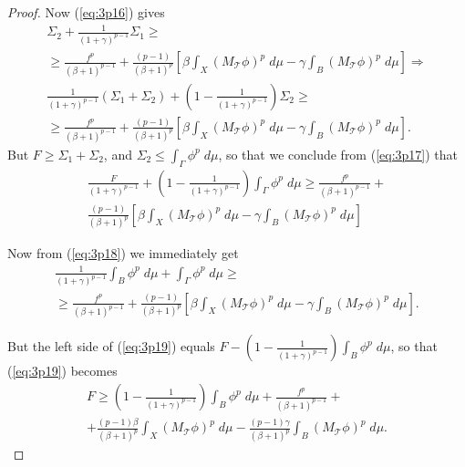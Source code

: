 \documentclass[10pt,a4paper]{amsart}
\newcommand{\mc}[1]{\mathcal{#1}}
\begin{document}
\begin{proof}
Now (\ref{eq:3p16}) gives
\begin{multline} \label{eq:3p17}
\Sigma_2+\frac{1}{(1+\gamma)^{p-1}}\Sigma_1\geq\\
\geq \frac{f^p}{(\beta+1)^{p-1}} + \frac{(p-1)}{(\beta+1)^p} \left[ \beta \int_X \left( M_{\mc T}\phi \right)^p\;d\mu -\gamma \int_B \left( M_{\mc T}\phi \right)^p\;d\mu \right] \Rightarrow\\
\frac{1}{(1+\gamma)^{p-1}} \left( \Sigma_1 + \Sigma_2 \right)+ \left( 1-\frac{1}{(1+\gamma)^{p-1}} \right)\Sigma_2\geq\\
\geq   \frac{f^p}{(\beta+1)^{p-1}}+ \frac{(p-1)}{(\beta+1)^p} \left[ \beta \int_X \left( M_{\mc T}\phi \right)^p\;d\mu -\gamma \int_B \left( M_{\mc T}\phi \right)^p\;d\mu \right].
\end{multline}
But $F\geq\Sigma_1+\Sigma_2$, and $\Sigma_2\leq \int_\Gamma \phi^p\;d\mu$, so that we conclude from (\ref{eq:3p17}) that
\begin{multline} \label{eq:3p18}
\frac{F}{(1+\gamma)^{p-1}} +  \left( 1-\frac{1}{(1+\gamma)^{p-1}} \right) \int_\Gamma \phi^p\;d\mu \geq \frac{f^p}{(\beta+1)^{p-1}}+\\
\frac{(p-1)}{(\beta+1)^p} \left[ \beta \int_X \left( M_{\mc T}\phi \right)^p\;d\mu -\gamma \int_B \left( M_{\mc T}\phi \right)^p\;d\mu \right]
\end{multline}

Now from (\ref{eq:3p18}) we immediately get
\begin{multline} \label{eq:3p19}
\frac{1}{(1+\gamma)^{p-1}}\int_B \phi^p\; d\mu + \int_\Gamma \phi^p\;d\mu \geq\\ \geq \frac{f^p}{(\beta+1)^{p-1}}+\frac{(p-1)}{(\beta+1)^p} \left[ \beta \int_X \left( M_{\mc T}\phi \right)^p\;d\mu -\gamma \int_B \left( M_{\mc T}\phi \right)^p\;d\mu \right].
\end{multline}

But the left side of (\ref{eq:3p19}) equals $F-\left(1-\frac{1}{(1+\gamma)^{p-1}} \right) \int_B \phi^p \; d\mu$, so that (\ref{eq:3p19}) becomes
\begin{multline} \label{eq:3p20}
F\geq \left( 1-\frac{1}{(1+\gamma)^{p-1}} \right) \int_B\phi^p\;d\mu + \frac{f^p}{(\beta+1)^{p-1}} +\\
+ \frac{(p-1)\beta}{(\beta+1)^p} \int_X \left( M_{\mc T}\phi \right)^p\;d\mu - \frac{(p-1)\gamma}{(\beta+1)^p} \int_B \left( M_{\mc T}\phi \right)^p\;d\mu.
\end{multline}



\end{proof}
\end{document}
